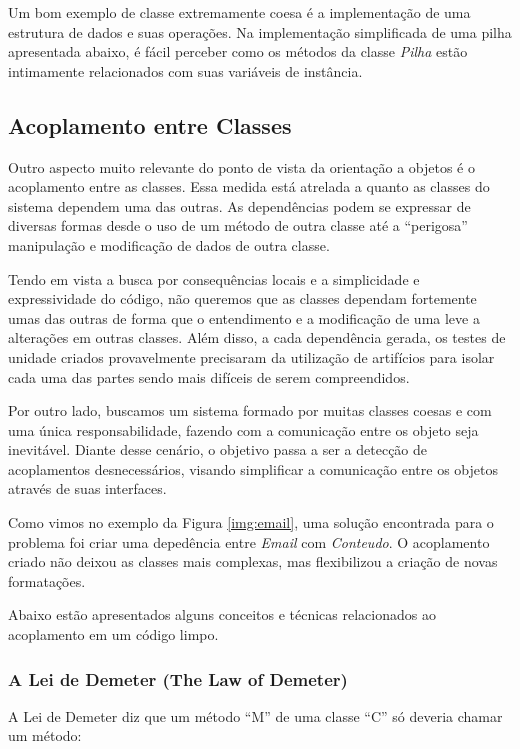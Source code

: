 Um bom exemplo de classe extremamente coesa é a implementação de uma estrutura de dados e suas operações. Na implementação 
simplificada de uma pilha apresentada abaixo, é fácil perceber como os métodos da classe \textit{Pilha} estão intimamente 
relacionados com suas variáveis de instância.



\subsection{Acoplamento entre Classes}
Outro aspecto muito relevante do ponto de vista da orientação a objetos é o acoplamento entre as classes. Essa medida 
está atrelada a quanto as classes do sistema dependem uma das outras. As dependências podem se expressar de diversas 
formas desde o uso de um método de outra classe até a ``perigosa'' manipulação e modificação de dados de outra classe.
	
Tendo em vista a busca por consequências locais e a simplicidade e expressividade do código, não queremos que as 
classes dependam fortemente umas das outras de forma que o entendimento e a modificação de uma leve a alterações em 
outras classes. Além disso, a cada dependência gerada, os testes de unidade criados provavelmente precisaram da 
utilização de artifícios para isolar cada uma das partes sendo mais difíceis de serem compreendidos.

Por outro lado, buscamos um sistema formado por muitas classes coesas e com uma única responsabilidade, fazendo com a comunicação 
entre os objeto seja inevitável. Diante desse cenário, o objetivo passa a ser a detecção de acoplamentos desnecessários, visando 
simplificar a comunicação entre os objetos através de suas interfaces.

Como vimos no exemplo da Figura \ref{img:email}, uma solução encontrada para o problema foi criar uma depedência entre \textit{Email} 
com \textit{Conteudo}. O acoplamento criado não deixou as classes mais complexas, mas flexibilizou a criação de novas formatações.

Abaixo estão apresentados alguns conceitos e técnicas relacionados ao acoplamento em um código limpo.

\subsubsection{A Lei de Demeter (The Law of Demeter)}
A Lei de Demeter diz que um método ``M'' de uma classe ``C'' só deveria chamar um método:

